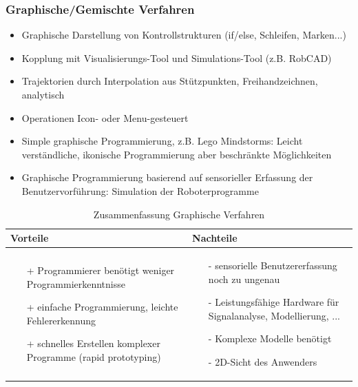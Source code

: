 \subsubsection{Graphische/Gemischte Verfahren}
\begin{itemize}
\item Graphische Darstellung von Kontrollstrukturen (if/else, Schleifen,
Marken...)
\item Kopplung mit Visualisierungs-Tool und Simulations-Tool (z.B. RobCAD)
\item  Trajektorien durch Interpolation aus Stützpunkten, Freihandzeichnen,
analytisch
\item Operationen Icon- oder Menu-gesteuert
\item Simple graphische Programmierung, z.B. Lego Mindstorms:
Leicht verständliche, ikonische Programmierung aber beschränkte Möglichkeiten
\item Graphische Programmierung basierend auf sensorieller Erfassung der
Benutzervorführung: Simulation der Roboterprogramme
\end{itemize}
\begin{table}[hbt]
\centering
\begin{tabular}{|p{7.5cm}|p{7.5cm}|}
\hline
Vorteile & Nachteile\\
\hline
\vspace{-5mm}
\begin{itemize}
\setlength\itemsep{0em}
\item[+] Programmierer benötigt weniger Programmierkenntnisse
\item[+] einfache Programmierung, leichte Fehlererkennung
\item[+] schnelles Erstellen komplexer Programme (rapid prototyping)
\end{itemize}
 &
 \vspace{-5mm}
\begin{itemize}
\setlength\itemsep{0em}
\item[-] sensorielle Benutzererfassung noch zu ungenau
\item[-] Leistungsfähige Hardware für Signalanalyse, Modellierung, ...
\item[-] Komplexe Modelle benötigt
\item[-] 2D-Sicht des Anwenders
\end{itemize}\\
\hline
\end{tabular}
\caption{Zusammenfassung Graphische Verfahren}
\label{tab:textprog}
\end{table}

